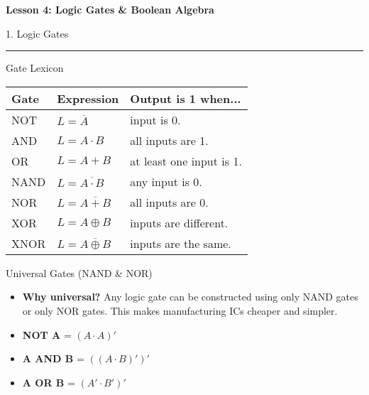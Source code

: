 \documentclass[a4paper, 8pt]{extarticle}
\newcommand{\sectionheading}[1]{%
  \par\vspace{0.7em}
  {\headingfont\fontsize{10.5pt}{11.5pt}\selectfont\color{black}#1}\par\nopagebreak
  \rule{\linewidth}{0.4pt}\vspace{0.2em}\nopagebreak
}
\newcommand{\subsectionheading}[1]{%
  \par\vspace{0.4em}\nopagebreak
  {\headingfont\fontsize{9pt}{10pt}\selectfont\color{black!80}#1}\par\nopagebreak\vspace{-0.3em}
}
\begin{document}
\pagestyle{empty}

\begin{center}
    {\headingfont\fontsize{12pt}{14pt}\selectfont \textbf{Lesson 4: Logic Gates \& Boolean Algebra}}
\end{center}
\vspace{-0.8em}

\begin{multicols}{3}


\sectionheading{1. Logic Gates}
\subsectionheading{Gate Lexicon}
\begin{tcolorbox}
\renewcommand{\arraystretch}{1.3} %
\begin{tabularx}{\linewidth}{l X X}
\textbf{Gate} & \textbf{Expression} & \textbf{Output is 1 when...} \\
\hline
NOT  & $L = \overline{A}$ & input is 0. \\ \hline
AND  & $L = A \cdot B$ & all inputs are 1. \\ \hline
OR   & $L = A + B$ & at least one input is 1. \\ \hline
NAND & $L = \overline{A \cdot B}$ & any input is 0. \\ \hline
NOR  & $L = \overline{A + B}$ & all inputs are 0. \\ \hline
XOR  & $L = A \oplus B$ & inputs are different. \\ \hline
XNOR & $L = \overline{A \oplus B}$ & inputs are the same. \\
\end{tabularx}
\end{tcolorbox}

\subsectionheading{Universal Gates (NAND \& NOR)}
\begin{itemize}
    \item \textbf{Why universal?} Any logic gate can be constructed using only NAND gates or only NOR gates. This makes manufacturing ICs cheaper and simpler.
\end{itemize}
\begin{tcolorbox}[title=Implementations with NAND]
\begin{itemize}
    \item \textbf{NOT A} = $(A \cdot A)'$
    \item \textbf{A AND B} = $((A \cdot B)')'$
    \item \textbf{A OR B} = $(A' \cdot B')'$
\end{itemize}
\end{tcolorbox}


\end{multicols}
\end{document}
